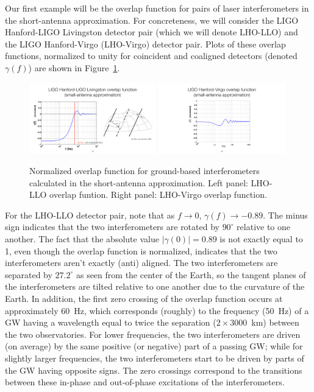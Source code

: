 Our first example will be the overlap function 
for pairs of laser interferometers in the short-antenna
approximation.
For concreteness, we will consider the 
LIGO Hanford-LIGO Livingston detector pair (which we will
denote LHO-LLO)
and the LIGO Hanford-Virgo (LHO-Virgo) detector pair.
Plots of these overlap functions, normalized to unity
for coincident and coaligned detectors 
(denoted $\gamma(f)$) are shown in Figure~\ref{f:orfs}.
%
\begin{figure}[htbp!]
\begin{center}
\includegraphics[width=0.49\textwidth]{Figures/LHO-LLO-orf}
\includegraphics[width=0.49\textwidth]{Figures/LHO-Virgo-orf}
\caption{Normalized overlap function for ground-based
interferometers calculated in the short-antenna approximation.
Left panel: LHO-LLO overlap funtion.
Right panel: LHO-Virgo overlap function.}
\label{f:orfs}
\end{center}
\end{figure}

For the LHO-LLO detector pair,
note that as $f\rightarrow 0$, $\gamma(f)\rightarrow -0.89$.
The minus sign indicates that the two interferometers
are rotated by $90^\circ$ relative to one another.
The fact that the absolute value $|\gamma(0)|=0.89$ is 
not exactly equal to 1, even though the overlap function
is normalized, indicates that the two interferometers
aren't exactly (anti) aligned.
The two interferometers are separated by $27.2^\circ$ as 
seen from the center of the Earth, so the tangent planes 
of the interferometers are tilted relative to one another due 
to the curvature of the Earth.
In addition, the first zero crossing of the overlap function
occurs at approximately 60~Hz, which corresponds (roughly)
to the frequency (50~Hz) of a GW having a wavelength 
equal to 
twice the separation ($2\times 3000$~km) between the two observatories.
For lower frequencies, the two interferometers are driven
(on average) by the same positive (or negative) part of a passing GW;
while for slightly larger frequencies, the two interferometers 
start to be driven by parts of the GW having opposite signs.  
The zero crossings correspond to the transitions between
these in-phase and out-of-phase excitations of the 
interferometers.

